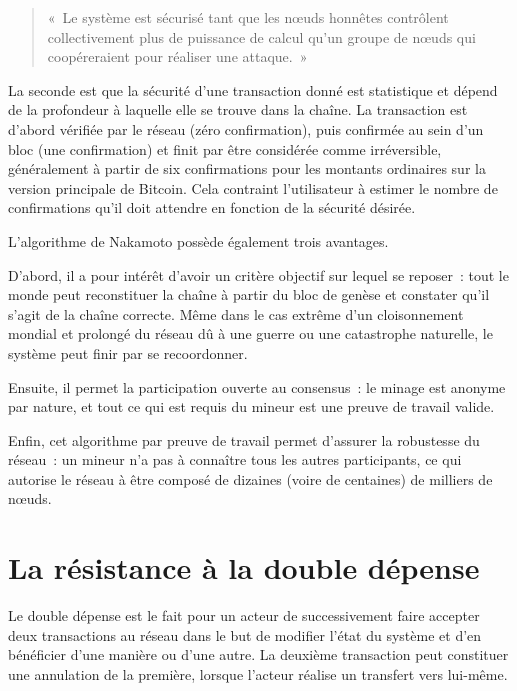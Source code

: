 \begin{quote}
«~Le système est sécurisé tant que les nœuds honnêtes contrôlent collectivement plus de puissance de calcul qu'un groupe de nœuds qui coopéreraient pour réaliser une attaque.~»
\end{quote}

La seconde est que la sécurité d'une transaction donné est statistique et dépend de la profondeur à laquelle elle se trouve dans la chaîne. La transaction est d'abord vérifiée par le réseau (zéro confirmation), puis confirmée au sein d'un bloc (une confirmation) et finit par être considérée comme irréversible, généralement à partir de six confirmations pour les montants ordinaires sur la version principale de Bitcoin. Cela contraint l'utilisateur à estimer le nombre de confirmations qu'il doit attendre en fonction de la sécurité désirée.


L'algorithme de Nakamoto possède également trois avantages. 

D'abord, il a pour intérêt d'avoir un critère objectif sur lequel se reposer~: tout le monde peut reconstituer la chaîne à partir du bloc de genèse et constater qu'il s'agit de la chaîne correcte. Même dans le cas extrême d'un cloisonnement mondial et prolongé du réseau dû à une guerre ou une catastrophe naturelle, le système peut finir par se recoordonner.

Ensuite, il permet la participation ouverte au consensus~: le minage est anonyme par nature, et tout ce qui est requis du mineur est une preuve de travail valide.

Enfin, cet algorithme par preuve de travail permet d'assurer la robustesse du réseau~: un mineur n'a pas à connaître tous les autres participants, ce qui autorise le réseau à être composé de dizaines (voire de centaines) de milliers de nœuds.

\section*{La résistance à la double dépense}

Le double dépense est le fait pour un acteur de successivement faire accepter deux transactions au réseau dans le but de modifier l'état du système et d'en bénéficier d'une manière ou d'une autre. La deuxième transaction peut constituer une annulation de la première, lorsque l'acteur réalise un transfert vers lui-même.

